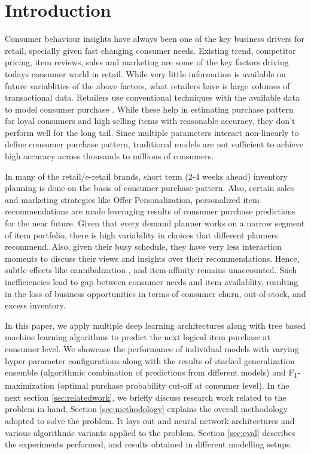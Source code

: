 \section{Introduction}
Consumer behaviour insights have always been one of the key business drivers for retail, specially given
fast changing consumer needs. Existing trend, competitor pricing, item reviews, sales and marketing are some of the 
key factors driving todays consumer world in retail. While very little information is available
on future variablities of the above factors, what retailers have is large volumes of transactional data.
Retailers use conventional techniques with the available data to model consumer purchase \cite{choudhury2019machine}. 
While these help in estimating purchase pattern for loyal consumers and high selling items with reasonable accuracy, they 
don't perform well for the long tail. Since multiple parameters interact non-linearly to define consumer purchase pattern,
traditional models are not sufficient to achieve high accuracy across thousands to millions of consumers.

In many of the retail/e-retail brands, short term (2-4 weeks ahead) inventory planning is done on the basis of consumer 
purchase pattern. Also, certain sales and marketing strategies like Offer Personalization, personalized item
recommendations are made leveraging results of consumer purchase predictions for the near future.
Given that every demand planner works on a narrow segment of item portfolio, there is high 
variability in choices that different planners recommend. Also, given their busy schedule, they have very less interaction
moments to discuss their views and insights over their recommendations. Hence, subtle effects like cannibalization
\cite{shah2007retailer}, and item-affinity remains unaccounted. Such inefficiencies lead to gap between consumer needs 
and item availablity, resulting in the loss of business opportunities in terms of consumer churn, out-of-stock, 
and excess inventory.

In this paper, we apply multiple deep learning architectures along with tree based machine learning algorithms
to predict the next logical item purchase at consumer level. We showcase the performance of individual models with 
varying hyper-parameter configurations along with the results of stacked generalization ensemble \cite{wolpert1992stacked} 
(algorithmic combination of predictions from different models) and F\textsubscript{1}-maximization (optimal purchase 
probability cut-off at consumer level).
In the next section \ref{sec:relatedwork}, we briefly discuss research work related to the problem in hand. 
Section \ref{sec:methodology} explains the overall methodology adopted to solve the problem.
It lays out and neural network architectures and various algorithmic variants applied to the problem.
Section \ref{sec:eval} describes the experiments performed, and results obtained in different modelling setups.

